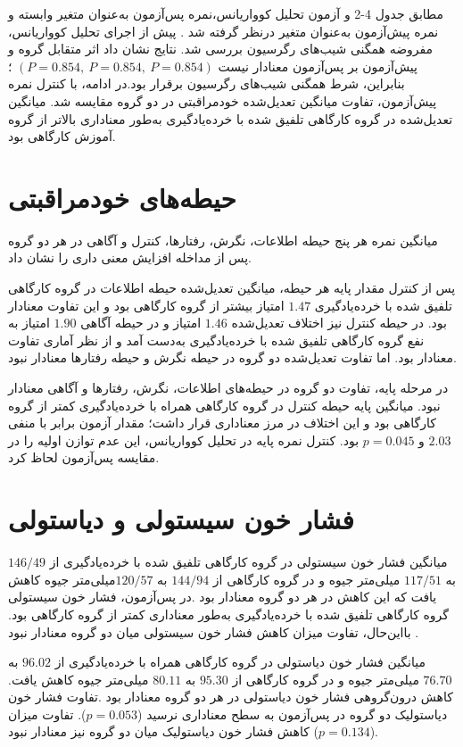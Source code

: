 


مطابق جدول 4-2 و آزمون تحلیل کوواریانس،نمره پس‌آزمون به‌عنوان متغیر وابسته و نمره پیش‌آزمون به‌عنوان متغیر  درنظر گرفته شد . پیش از اجرای تحلیل کوواریانس، مفروضه همگنی شیب‌های رگرسیون بررسی شد. نتایج نشان داد اثر متقابل گروه و پیش‌آزمون بر پس‌آزمون معنادار نیست  $(P=0.854, \ P=0.854, \ P=0.854)$ ؛ بنابراین، شرط همگنی شیب‌های رگرسیون برقرار بود.در ادامه، با کنترل نمره پیش‌آزمون، تفاوت میانگین تعدیل‌شده خودمراقبتی در دو گروه مقایسه شد. میانگین تعدیل‌شده در گروه کارگاهی تلفیق شده با خرده‌یادگیری  به‌طور معناداری بالاتر از گروه آموزش کارگاهی بود.



\section{حیطه‌های خودمراقبتی}
میانگین نمره هر پنج حیطه اطلاعات، نگرش، رفتارها، کنترل و آگاهی در هر دو گروه پس از مداخله افزایش معنی داری را نشان داد.
\par
پس از کنترل مقدار پایه هر حیطه، میانگین تعدیل‌شده حیطه اطلاعات در گروه کارگاهی تلفیق شده با خرده‌یادگیری $1.47$ امتیاز بیشتر از گروه کارگاهی بود و این تفاوت معنادار بود. در حیطه کنترل نیز اختلاف تعدیل‌شده $1.46$ امتیاز و در حیطه آگاهی $1.90$  امتیاز به نفع گروه کارگاهی تلفیق شده با خرده‌یادگیری به‌دست آمد و از نظر آماری تفاوت معنادار بود. اما تفاوت تعدیل‌شده دو گروه در حیطه نگرش و حیطه رفتارها معنادار نبود.



در مرحله پایه، تفاوت دو گروه در حیطه‌های اطلاعات، نگرش، رفتارها و آگاهی معنادار نبود. میانگین پایه حیطه کنترل در گروه کارگاهی همراه با خرده‌یادگیری کمتر از گروه کارگاهی بود و این اختلاف در مرز معناداری قرار داشت؛ مقدار آزمون  برابر با منفی $2.03$ و $p=0.045$ بود. کنترل نمره پایه در تحلیل کوواریانس، این عدم توازن اولیه را در مقایسه پس‌آزمون لحاظ کرد.

\section{فشار خون سیستولی و دیاستولی}
میانگین فشار خون سیستولی در گروه کارگاهی تلفیق شده با خرده‌یادگیری از  $146/49$ به $117/51$ میلی‌متر جیوه و در گروه کارگاهی از $144/94$ به $120/57$میلی‌متر جیوه کاهش یافت که این کاهش در هر دو گروه معنادار بود .در پس‌آزمون، فشار خون سیستولی گروه کارگاهی تلفیق شده با خرده‌یادگیری به‌طور معناداری کمتر از گروه کارگاهی بود. بااین‌حال، تفاوت میزان کاهش فشار خون سیستولی میان دو گروه معنادار نبود .
\par
میانگین فشار خون دیاستولی در گروه کارگاهی همراه با خرده‌یادگیری از $96.02$ به $76.70$ میلی‌متر جیوه و در گروه کارگاهی از $95.30$ به $80.11$ میلی‌متر جیوه کاهش یافت. کاهش درون‌گروهی فشار خون دیاستولی در هر دو گروه معنادار بود .تفاوت فشار خون دیاستولیک دو گروه در پس‌آزمون به سطح معناداری نرسید ($p=0.053$). تفاوت میزان کاهش فشار خون دیاستولیک میان دو گروه نیز معنادار نبود ($p=0.134$).

